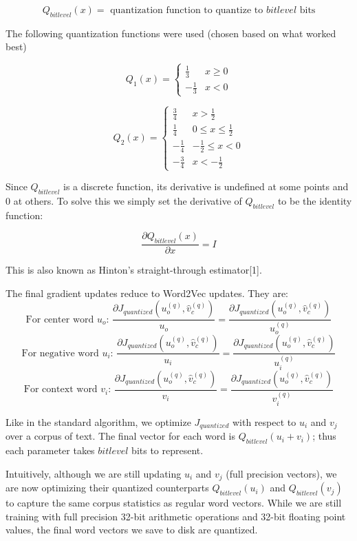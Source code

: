 \documentclass{article} %
\begin{document}
$$
Q_{bitlevel}(x) = \mbox{ quantization function to quantize to } bitlevel \mbox{ bits}
$$

The following quantization functions were used (chosen based on what worked best)

\[
Q_1(x) =
\begin{cases}
  \frac{1}{3} & x \geq 0\\
  -\frac{1}{3} & x < 0
\end{cases}
\]


\[
Q_2(x) =
\begin{cases}
  \frac{3}{4} & x > \frac{1}{2}\\
  \frac{1}{4} & 0 \leq x \leq \frac{1}{2}\\
  -\frac{1}{4} & -\frac{1}{2} \leq x < 0\\
  -\frac{3}{4} & x < -\frac{1}{2}
\end{cases}
\]

Since $Q_{bitlevel}$ is a discrete function, its derivative is
undefined at some points and 0 at others. To solve this we simply set
the derivative of $Q_{bitlevel}$ to be the identity function:

$$
\frac{\partial Q_{bitlevel}(x)}{\partial x} = I
$$

This is also known as Hinton's straight-through estimator[1].

The final gradient updates reduce to Word2Vec updates. They are:
$$
\mbox{For center word } u_o \textbf{: } \frac{\partial J_{quantized} (u^{(q)}_o, \hat{v}^{(q)}_c)}{u_o} = \frac{\partial J_{quantized} (u^{(q)}_o, \hat{v}^{(q)}_c)}{u^{(q)}_o}
$$
$$
\mbox{For negative word } u_i \textbf{: } \frac{\partial J_{quantized} (u^{(q)}_o, \hat{v}^{(q)}_c)}{u_i} = \frac{\partial J_{quantized} (u^{(q)}_o, \hat{v}^{(q)}_c)}{u^{(q)}_i}
$$
$$
\mbox{For context word } v_i \textbf{: } \frac{\partial J_{quantized} (u^{(q)}_o, \hat{v}^{(q)}_c)}{v_i} = \frac{\partial J_{quantized} (u^{(q)}_o, \hat{v}^{(q)}_c)}{v^{(q)}_i}
$$

Like in the standard algorithm, we optimize $J_{quantized}$ with
respect to $u_i$ and $v_j$ over a corpus of text. The final vector
for each word is $Q_{bitlevel}(u_i + v_i)$; thus each parameter takes
$bitlevel$ bits to represent.

Intuitively, although we are still updating $u_i$ and $v_j$ (full
precision vectors), we are now optimizing their quantized
counterparts $Q_{bitlevel}(u_i)$ and $Q_{bitlevel}(v_j)$ to capture
the same corpus statistics as regular word vectors. While we are still
training with full precision 32-bit arithmetic operations and 32-bit floating
point values, the final word vectors we save to disk are
quantized.
\end{document}
